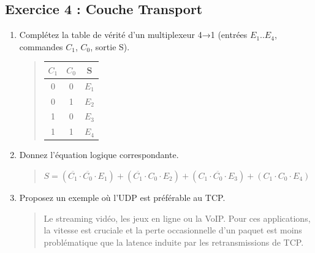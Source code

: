 \documentclass[a4paper,12pt]{article}
\begin{document}
\subsection*{Exercice 4 : Couche Transport}
\begin{enumerate}
    \item Complétez la table de vérité d'un multiplexeur 4→1 (entrées $E_{1}$..$E_{4}$, commandes $C_{1}$, $C_{0}$, sortie S).
    \begin{quote}
        \begin{tabular}{|cc|c|}
            \hline
            $C_1$ & $C_0$ & S \\ 
            \hline
            0 & 0 & $E_1$ \\ 
            0 & 1 & $E_2$ \\ 
            1 & 0 & $E_3$ \\ 
            1 & 1 & $E_4$ \\ 
            \hline
        \end{tabular}
    \end{quote}
    \item Donnez l'équation logique correspondante.
    \begin{quote}
        $S = (\overline{C_1} \cdot \overline{C_0} \cdot E_1) + (\overline{C_1} \cdot C_0 \cdot E_2) + (C_1 \cdot \overline{C_0} \cdot E_3) + (C_1 \cdot C_0 \cdot E_4)$
    \end{quote}

    \item Proposez un exemple où l'UDP est préférable au TCP.
    \begin{quote}
        Le streaming vidéo, les jeux en ligne ou la VoIP. Pour ces applications, la vitesse est cruciale et la perte occasionnelle d'un paquet est moins problématique que la latence induite par les retransmissions de TCP.
    \end{quote}
\end{enumerate}
\end{document}

